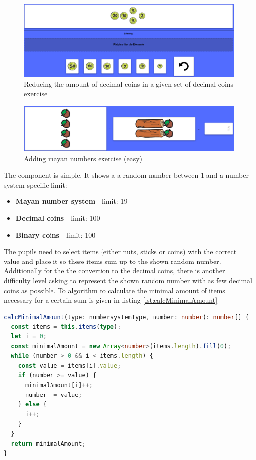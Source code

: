 \begin{figure} 
  \centering
  \includegraphics[width=1.0 \columnwidth]{figures/coins_swap.png}
  \caption{Reducing the amount of decimal coins in a given set of decimal coins exercise} 
  \label{fig:coinsSwap} 
\end{figure}

\begin{figure} 
  \centering
  \includegraphics[width=1.0 \columnwidth]{figures/mayas_addition.png}
  \caption{Adding mayan numbers exercise (easy)} 
  \label{fig:mayanAddition} 
\end{figure}

The  component is simple. It shows a a random number between 1 and a number system specific limit:

\begin{itemize}
  \item \textbf{Mayan number system} - limit: 19
  \item \textbf{Decimal coins} - limit: 100
  \item \textbf{Binary coins} - limit: 100
\end{itemize}

The pupils need to select items (either nuts, sticks or coins) with the correct value and place it so these items sum up to the shown random number.
Additionally for the the convertion to the decimal coins, there is another difficulty level asking to represent the shown random number with as few decimal coins as possible. To algorithm to calculate the minimal amount of items necessary for a certain sum is given in listing \ref{lst:calcMinimalAmount} 


\begin{lstlisting}[language=TypeScript,caption={Calculate minimal amount of items needed to reach a certain number},label={lst:calcMinimalAmount}]
calcMinimalAmount(type: numbersystemType, number: number): number[] {
  const items = this.items(type);
  let i = 0;
  const minimalAmount = new Array<number>(items.length).fill(0);
  while (number > 0 && i < items.length) {
    const value = items[i].value;
    if (number >= value) {
      minimalAmount[i]++;
      number -= value;
    } else {
      i++;
    }
  }
  return minimalAmount;
}
\end{lstlisting}

